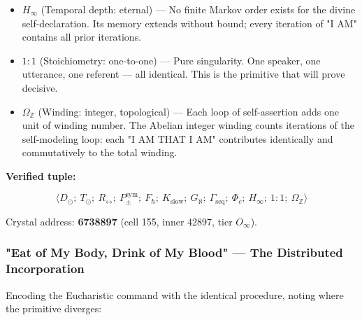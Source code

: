 \documentclass[12pt,a4paper]{article}
\begin{document}
\begin{itemize}
    \item \textbf{$H_{\infty}$} (Temporal depth: eternal) --- No finite Markov order exists for the divine self-declaration. Its memory extends without bound; every iteration of "I AM" contains all prior iterations.
    \item \textbf{$1{:}1$} (Stoichiometry: one-to-one) --- Pure singularity. One speaker, one utterance, one referent --- all identical. This is the primitive that will prove decisive.
    \item \textbf{$\Omega_\mathbb{Z}$} (Winding: integer, topological) --- Each loop of self-assertion adds one unit of winding number. The Abelian integer winding counts iterations of the self-modeling loop: each "I AM THAT I AM" contributes identically and commutatively to the total winding.
\end{itemize}

\textbf{Verified tuple:}


\[\langle D_{\odot};\ T_{\odot};\ R_{\leftrightarrow};\ P_{\pm}^{\text{sym}};\ F_{\hbar};\ K_{\text{slow}};\ G_{\aleph};\ \Gamma_{\text{seq}};\ \Phi_c;\ H_{\infty};\ 1{:}1;\ \Omega_\mathbb{Z} \rangle\]

Crystal address: \textbf{6738897} (cell 155, inner 42897, tier $O_{\infty}$).

\subsubsection{"Eat of My Body, Drink of My Blood" --- The Distributed Incorporation}

Encoding the Eucharistic command with the identical procedure, noting where the primitive diverges:
\end{document}
